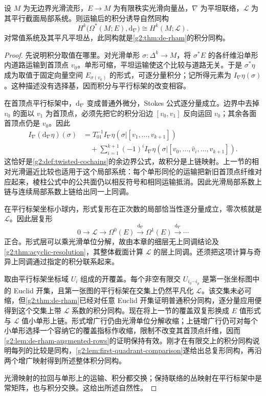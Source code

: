 \begin{theorem}\label{g2:thm:twisted-de-rham}
	设 \(M\) 为无边界光滑流形，\(E\to M\) 为有限秩实光滑向量丛，\(\nabla\) 为平坦联络，\(\mathcal L\) 为其平行截面局部系统。则运输后的积分诱导自然同构
	\[
		H^k\bigl(\Omega^*(M;E),\mathrm d_\nabla\bigr)
		\cong H^k(M;\mathcal L).
	\]
	对常值系统及其平凡平坦丛，此同构就是\cref{g2:thm:de-rham}的积分同构。
\end{theorem}
\begin{proof}
	先说明积分取值在哪里。对光滑单形 \(\sigma:\Delta^k\to M\)，将 \(\sigma^*E\) 的各纤维沿单形内道路运输到首顶点 \(v_0\)。单形可缩，平坦运输使这个比较与道路无关。于是 \(\sigma^*\eta\) 成为取值于固定向量空间 \(E_{\sigma(v_0)}\) 的形式，可逐分量积分；记所得元素为 \(I_\nabla\eta(\sigma)\)。这种描述没有选择基，因而积分与平行标架的改变相容。

	在首顶点平行标架中，\(\mathrm d_\nabla\) 变成普通外微分，Stokes 公式逐分量成立。边界中去掉 \(v_0\) 的面以 \(v_1\) 为首顶点，必须先把它的积分沿边 \([v_0,v_1]\) 反向运回 \(v_0\)；其余各面首顶点仍是 \(v_0\)。因此
	\begin{align*}
		I_\nabla(\mathrm d_\nabla\eta)(\sigma)
		&=T_{01}^{-1}I_\nabla\eta(\sigma|[v_1,\ldots,v_{k+1}])\\
		&\quad+\sum_{i=1}^{k+1}(-1)^iI_\nabla\eta(\sigma|[v_0,\ldots,\widehat v_i,\ldots,v_{k+1}]).
	\end{align*}
	这恰好是\cref{g2:def:twisted-cochains}的余边界公式，故积分是上链映射。上一节的相对光滑逼近比较也适用于这个局部系统：每个单形同伦的运输把新旧首顶点纤维对应起来，棱柱公式中的公共面仍以相反符号和相同运输抵消。因此光滑局部系数上链与连续局部系数上链给出同一上同调。

	在平行标架坐标小球内，形式复形在正次数的局部恰当性逐分量成立，零次核就是 \(\mathcal L\)。因此层复形
	\[
		0\longrightarrow\mathcal L\longrightarrow\Omega^0(E)
		\xrightarrow{\mathrm d_\nabla}\Omega^1(E)
		\xrightarrow{\mathrm d_\nabla}\cdots
	\]
	正合。形式层可以乘光滑单位分解，故由本章的细层无上同调结论及\cref{g2:thm:acyclic-resolution}，其整体截面计算 \(\mathcal L\) 的层上同调。还须把这项计算与奇异上同调通过指定的积分联系起来。

	取由平行标架坐标域 \(U_i\) 组成的开覆盖。每个非空有限交 \(U_{i_0\cdots i_p}\) 是第一张坐标图中的 Euclid 开集，且第一张图的平行标架在交集上仍然平凡化 \(\mathcal L\)。该交集未必可缩，但\cref{g2:thm:de-rham}已经对任意 Euclid 开集证明普通积分同构，逐分量应用便得到这个交集上带 \(\mathcal L\) 系数的积分同构。现在将上一节的覆盖双复形换成 \(E\) 值形式与 \(\mathcal L\) 值小单形上链。形式增广行仍由光滑单位分解收缩；上链增广行仍可对每个小单形选择一个容纳它的覆盖指标作收缩，限制不改变其首顶点纤维，因而\cref{g2:lem:de-rham-augmented-rows}的证明保持有效。刚才在有限交上的积分同构说明每列的比较是同构，\cref{g2:lem:first-quadrant-comparison}遂给出总复形同构，再沿两个增广映射得到所述整体积分同构。

	光滑映射的拉回与单形上的运输、积分都交换；保持联络的丛映射在平行标架中是常矩阵，也与积分交换。这给出所述自然性。
\end{proof}


